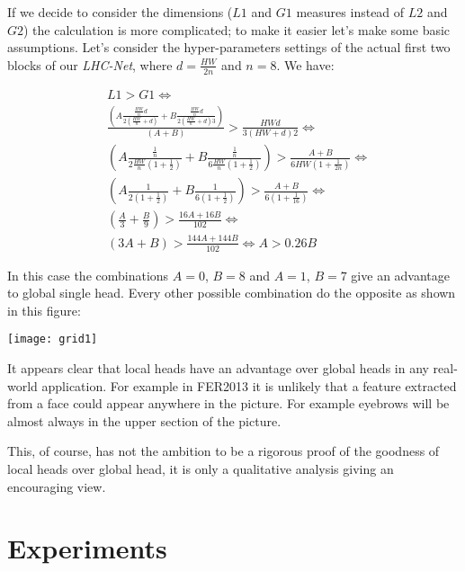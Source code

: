 \documentclass[fleqn,10pt]{SelfArx}
\begin{document}
If we decide to consider the dimensions ($L1$ and $G1$ measures instead of $L2$ and $G2$) the calculation is more complicated; to make it easier let's make some basic assumptions. Let's consider the hyper-parameters settings of the actual first two blocks of our \textit{LHC-Net}, where $d = \frac{HW}{2n}$ and $n = 8$. We have:

\begin{align}
             &L1 > G1 \Leftrightarrow \nonumber \\
             &\frac{\left(A\frac{\frac{HW}{n}d}{2(\frac{HW}{n} + d)} +  B\frac{\frac{HW}{n}d}{2(\frac{HW}{n} + d)3}\right)}{(A + B)}  > \frac{HWd}{3(HW + d)2} \Leftrightarrow \nonumber\\
             &\left(A\frac{\frac{1}{n}}{2\frac{HW}{n}(1 + \frac{1}{2})} +  B\frac{\frac{1}{n}}{6\frac{HW}{n}(1 + \frac{1}{2})}\right)  > \frac{A+B}{6HW(1 + \frac{1}{2n})} \Leftrightarrow \nonumber \\
             &\left(A\frac{1}{2(1 + \frac{1}{2})} +  B\frac{1}{6(1 + \frac{1}{2})}\right)  > \frac{A+B}{6(1 + \frac{1}{16})} \Leftrightarrow \nonumber \\
             &\left(\frac{A}{3} + \frac{B}{9}\right)  > \frac{16A+16B}{102} \Leftrightarrow \nonumber \\
             &\left(3A + B\right)  > \frac{144A+144B}{102} \Leftrightarrow A > 0.26B\nonumber
\end{align}

In this case the combinations $A=0$, $B=8$ and $A=1$, $B=7$ give an advantage to global single head. Every other possible combination do the opposite as shown in this figure:

\noindent\texttt{[image: grid1]}

It appears clear that local heads have an advantage over global heads in any real-world application. For example in FER2013 it is unlikely that a feature extracted from a face could appear anywhere in the picture. For example eyebrows will be almost always in the upper section of the picture.

This, of course, has not the ambition to be a rigorous proof of the goodness of local heads over global head, it is only a qualitative analysis giving an encouraging view.

\section{Experiments}
\end{document}
